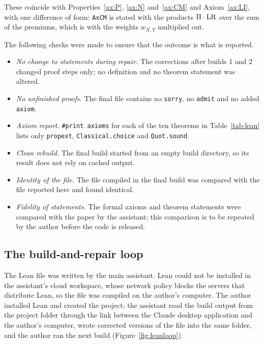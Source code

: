 These coincide with Properties~\ref{ax:P}, \ref{ax:N} and~\ref{ax:CM} and Axiom~\ref{ax:LI}, with one difference of
form: \texttt{AxCM} is stated with the products $\Pi\cdot\mathrm{LR}$ over the sum of the premiums, which is \axCM{} with
the weights $w_{X,Y}$ multiplied out.

The following checks were made to ensure that the outcome is what is reported.

\begin{itemize}[nosep]
\item \emph{No change to statements during repair.} The corrections after builds 1 and 2 changed proof steps only;
  no definition and no theorem statement was altered.
\item \emph{No unfinished proofs.} The final file contains no \texttt{sorry}, no \texttt{admit} and no added
  \texttt{axiom}.
\item \emph{Axiom report.} \texttt{\#print axioms} for each of the ten theorems in Table~\ref{tab:lean} lists only
  \texttt{propext}, \texttt{Classical.choice} and \texttt{Quot.sound}.
\item \emph{Clean rebuild.} The final build started from an empty build directory, so its result does not rely on
  cached output.
\item \emph{Identity of the file.} The file compiled in the final build was compared with the file reported here and
  found identical.
\item \emph{Fidelity of statements.} The formal axioms and theorem statements were compared with the paper by the
  assistant; this comparison is to be repeated by the author before the code is released.
\end{itemize}


\subsection{The build-and-repair loop}

The Lean file was written by the main assistant. Lean could not be installed in the assistant's cloud workspace,
whose network policy blocks the servers that distribute Lean, so the file was compiled on the author's computer.
The author installed Lean and created the project; the assistant read the build output from the project folder
through the link between the Claude desktop application and the author's computer, wrote corrected versions of the
file into the same folder, and the author ran the next build (Figure~\ref{fig:leanloop}).


